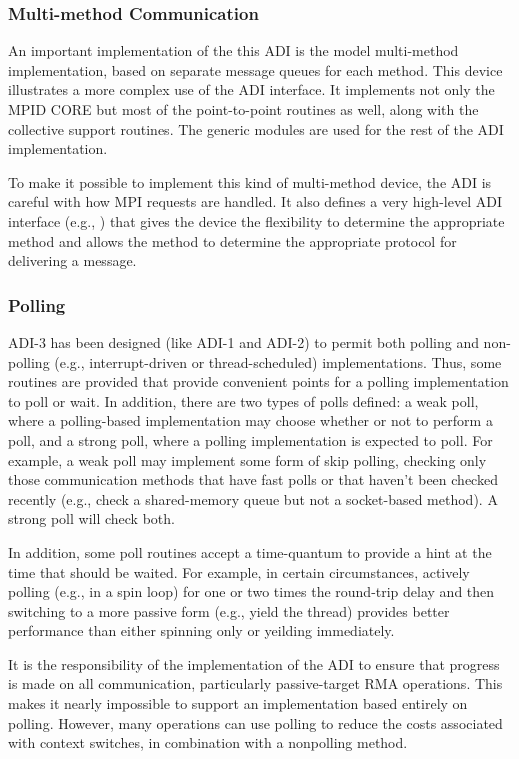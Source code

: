 \documentclass{article}
\begin{document}
\subsubsection{Multi-method Communication}
An important implementation of the this ADI is the model multi-method
implementation, based on separate message queues for each method.
This device illustrates a more complex use of the ADI interface.  It
implements not only the MPID CORE but most of the point-to-point
routines as well, along with the collective support routines.  The
generic modules are used for the rest of the ADI implementation.

To make it possible to implement this kind of multi-method device, the
ADI is careful with how MPI requests are handled.  It also defines a
very high-level ADI interface (e.g., ) that gives the
device the flexibility to determine the appropriate method and allows
the method to determine the appropriate protocol for delivering a message.

\subsubsection{Polling}
ADI-3 has been designed (like ADI-1 and ADI-2) to permit both polling and
non-polling (e.g., interrupt-driven or thread-scheduled) implementations.
Thus, some routines are provided that provide convenient points for a polling
implementation to poll or wait.  In addition, there are two types of
polls defined: a weak poll, where a polling-based implementation may
choose whether or not to perform a poll, and a strong poll, where a
polling implementation is expected to poll.  For example, a weak poll
may implement some form of skip polling, checking only those
communication methods that have fast polls or that haven't been
checked recently (e.g., check a shared-memory queue but not a
socket-based method).  A strong poll will check both.

In addition, some poll routines accept a time-quantum to provide a
hint at the time that should be waited.  For example, in certain
circumstances, actively polling (e.g., in a spin loop) for one or two
times the round-trip delay and then switching to a more passive form
(e.g., yield the thread) provides better performance than either
spinning only or yeilding immediately.


It is the responsibility of the implementation of the ADI to ensure that
progress is made on all communication, particularly passive-target RMA
operations.  This makes it nearly impossible to support an implementation
based entirely on polling.  However, many operations can use polling to reduce
the costs associated with context switches, in combination with a nonpolling
method.
\end{document}
